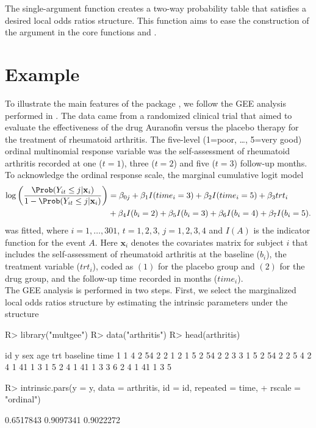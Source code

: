 \documentclass[article,shortnames,nojss]{jss}
\begin{document}
The single-argument function  creates a two-way probability table that satisfies a desired local odds ratios structure. This function aims to ease the construction of the  argument in the core functions  and .

\section{Example}\label{Example}
To illustrate the main features of the package , we follow the GEE analysis performed in \cite{Touloumis2012}. The data came from a randomized clinical trial \citep{Lipsitz1994} that aimed to evaluate the effectiveness of the drug Auranofin versus the placebo therapy for the treatment of rheumatoid arthritis. The five-level (1=poor, \ldots, 5=very good) ordinal multinomial response variable was the self-assessment of rheumatoid arthritis recorded at one ($t=1$), three ($t=2$) and five ($t=3$) follow-up months. To acknowledge the ordinal response scale, the marginal cumulative logit model 
\begin{align}
\log \left(\frac{\Prob(Y_{it}\leq j|\mathbf x_i)}{1-\Prob(Y_{it}\leq j|\mathbf x_i)}\right)&=\beta_{0j}+\beta_1 I(time_i=3)+\beta_2 I(time_i=5) +\beta_3 trt_i   \nonumber\\ 
                                                     &+\beta_4 I(b_i=2)+\beta_5 I(b_i=3)+\beta_6 I(b_i=4)+\beta_7 I(b_i=5).
\label{MarginalModelData}
\end{align} 
was fitted, where $i=1,\ldots,301$, $t=1,2,3$, $j=1,2,3,4$ and $I(A)$ is the indicator function for the event $A$. Here $\mathbf x_i$ denotes the covariates matrix for subject $i$ that includes the self-assessment of rheumatoid arthritis at the baseline ($b_i$), the treatment variable ($trt_i$), coded as $(1)$ for the placebo group and $(2)$ for the drug group, and the follow-up time recorded in months ($time_i$).\\
The GEE analysis is performed in two steps. First, we select the marginalized local odds ratios structure by estimating the intrinsic parameters under the  structure

\begin{Schunk}
\begin{Sinput}
R> library("multgee")
R> data("arthritis")
R> head(arthritis)
\end{Sinput}
\begin{Soutput}
  id y sex age trt baseline time
1  1 4   2  54   2        2    1
2  1 5   2  54   2        2    3
3  1 5   2  54   2        2    5
4  2 4   1  41   1        3    1
5  2 4   1  41   1        3    3
6  2 4   1  41   1        3    5
\end{Soutput}
\begin{Sinput}
R> intrinsic.pars(y = y, data = arthritis, id = id, repeated = time,
+                     rscale = "ordinal")
\end{Sinput}
\begin{Soutput}
[1] 0.6517843 0.9097341 0.9022272
\end{Soutput}
\end{Schunk}
\end{document}
